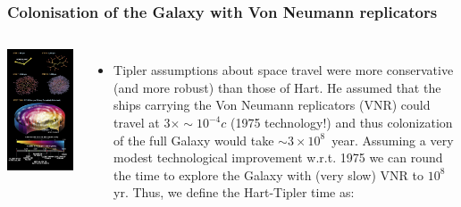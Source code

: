 \begin{frame}
\frametitle{Colonisation of the Galaxy with Von Neumann replicators}

\begin{columns}
\includegraphics[scale=0.5]{colonisation.png} 

\begin{itemize}
\item Tipler assumptions about space travel were more conservative (and more robust) than those of Hart. He assumed that the ships carrying the Von Neumann replicators (VNR) could travel at 
$3 \times \sim 10^{-4}c$ (1975 technology!) and thus colonization of the full Galaxy would take $\sim 3 \times  10^{8}$~year. Assuming a very modest technological improvement w.r.t. 1975 we can round the time to explore the Galaxy with (very slow) VNR to $10^8$yr. Thus, we define the Hart-Tipler time as:
\end{itemize}


\end{columns}
\end{frame}
